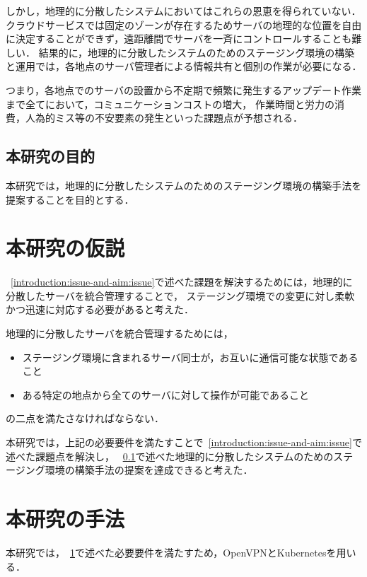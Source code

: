 しかし，地理的に分散したシステムにおいてはこれらの恩恵を得られていない．
クラウドサービスでは固定のゾーンが存在するためサーバの地理的な位置を自由に決定することができず，遠距離間でサーバを一斉にコントロールすることも難しい．
結果的に，地理的に分散したシステムのためのステージング環境の構築と運用では，各地点のサーバ管理者による情報共有と個別の作業が必要になる．

つまり，各地点でのサーバの設置から不定期で頻繁に発生するアップデート作業まで全てにおいて，コミュニケーションコストの増大，
作業時間と労力の消費，人為的ミス等の不安要素の発生といった課題点が予想される．

\subsection{本研究の目的}
\label{introduction:issue-and-aim:aim}

本研究では，地理的に分散したシステムのためのステージング環境の構築手法を提案することを目的とする．

\section{本研究の仮説}
\label{introduction:hypothesis}

~\ref{introduction:issue-and-aim:issue}で述べた課題を解決するためには，地理的に分散したサーバを統合管理することで，
ステージング環境での変更に対し柔軟かつ迅速に対応する必要があると考えた．

地理的に分散したサーバを統合管理するためには，
\begin{itemize}
  \item ステージング環境に含まれるサーバ同士が，お互いに通信可能な状態であること
  \item ある特定の地点から全てのサーバに対して操作が可能であること
\end{itemize}
の二点を満たさなければならない．

本研究では，上記の必要要件を満たすことで~\ref{introduction:issue-and-aim:issue}で述べた課題点を解決し，
~\ref{introduction:issue-and-aim:aim}で述べた地理的に分散したシステムのためのステージング環境の構築手法の提案を達成できると考えた．

\section{本研究の手法}
\label{introduction:proposal}

本研究では，~\ref{introduction:hypothesis}で述べた必要要件を満たすため，OpenVPNとKubernetesを用いる．

